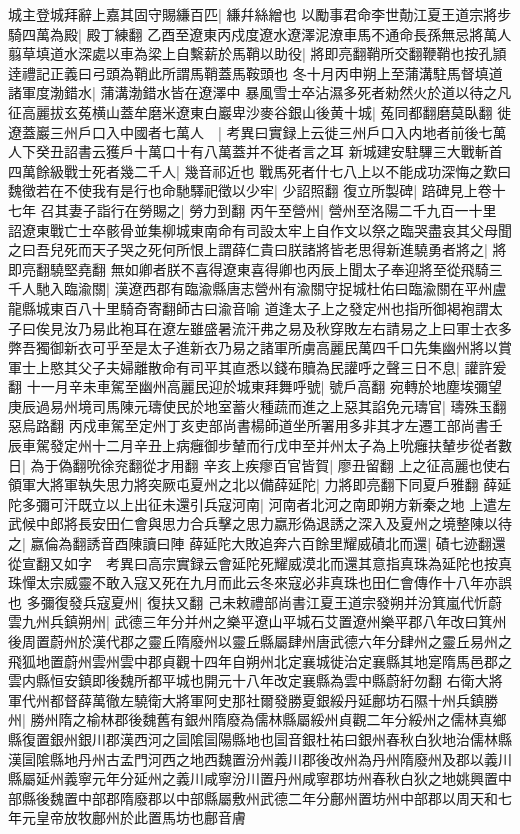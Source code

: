 城主登城拜辭上嘉其固守賜縑百匹|{
	縑幷絲繒也}
以勵事君命李世勣江夏王道宗將步騎四萬為殿|{
	殿丁練翻}
乙酉至遼東丙戍度遼水遼澤泥潦車馬不通命長孫無忌將萬人翦草填道水深處以車為梁上自繫薪於馬鞘以助役|{
	將即亮翻鞘所交翻鞭鞘也按孔頴逹禮記正義曰弓頭為鞘此所謂馬鞘蓋馬鞍頭也}
冬十月丙申朔上至蒲溝駐馬督填道諸軍度渤錯水|{
	蒲溝渤錯水皆在遼澤中}
暴風雪士卒沾濕多死者勑然火於道以待之凡征高麗拔玄菟横山蓋牟磨米遼東白巖卑沙麥谷銀山後黄十城|{
	菟同都翻磨莫臥翻}
徙遼蓋巖三州戶口入中國者七萬人　|{
	考異曰實録上云徙三州戶口入内地者前後七萬人下癸丑詔書云獲戶十萬口十有八萬蓋并不徙者言之耳}
新城建安駐驆三大戰斬首四萬餘級戰士死者幾二千人|{
	幾音祁近也}
戰馬死者什七八上以不能成功深悔之歎曰魏徵若在不使我有是行也命馳驛祀徵以少牢|{
	少詔照翻}
復立所製碑|{
	踣碑見上卷十七年}
召其妻子詣行在勞賜之|{
	勞力到翻}
丙午至營州|{
	營州至洛陽二千九百一十里}
詔遼東戰亡士卒骸骨並集柳城東南命有司設太牢上自作文以祭之臨哭盡哀其父母聞之曰吾兒死而天子哭之死何所恨上謂薛仁貴曰朕諸將皆老思得新進驍勇者將之|{
	將即亮翻驍堅堯翻}
無如卿者朕不喜得遼東喜得卿也丙辰上聞太子奉迎將至從飛騎三千人馳入臨渝關|{
	漢遼西郡有臨渝縣唐志營州有渝關守捉城杜佑曰臨渝關在平州盧龍縣城東百八十里騎奇寄翻師古曰渝音喻}
道逢太子上之發定州也指所御褐袍謂太子曰俟見汝乃易此袍耳在遼左雖盛暑流汗弗之易及秋穿敗左右請易之上曰軍士衣多弊吾獨御新衣可乎至是太子進新衣乃易之諸軍所虜高麗民萬四千口先集幽州將以賞軍士上愍其父子夫婦離散命有司平其直悉以錢布贖為民讙呼之聲三日不息|{
	讙許爰翻}
十一月辛未車駕至幽州高麗民迎於城東拜舞呼號|{
	號戶高翻}
宛轉於地塵埃彌望庚辰過易州境司馬陳元璹使民於地室蓄火種蔬而進之上惡其諂免元璹官|{
	璹殊玉翻惡烏路翻}
丙戍車駕至定州丁亥吏部尚書楊師道坐所署用多非其才左遷工部尚書壬辰車駕發定州十二月辛丑上病癰御步輦而行戊申至并州太子為上吮癰扶輦步從者數日|{
	為于偽翻吮徐兖翻從才用翻}
辛亥上疾瘳百官皆賀|{
	廖丑留翻}
上之征高麗也使右領軍大將軍執失思力將突厥屯夏州之北以備薛延陀|{
	力將即亮翻下同夏戶雅翻}
薛延陀多彌可汗既立以上出征未還引兵寇河南|{
	河南者北河之南即朔方新秦之地}
上遣左武候中郎將長安田仁會與思力合兵擊之思力嬴形偽退誘之深入及夏州之境整陳以待之|{
	嬴倫為翻誘音酉陳讀曰陣}
薛延陀大敗追奔六百餘里耀威磧北而還|{
	磧七迹翻還從宣翻又如字　考異曰高宗實録云會延陀死耀威漠北而還其意指真珠為延陀也按真珠憚太宗威靈不敢入寇又死在九月而此云冬來寇必非真珠也田仁會傳作十八年亦誤也}
多彌復發兵寇夏州|{
	復扶又翻}
己未敕禮部尚書江夏王道宗發朔并汾箕嵐代忻蔚雲九州兵鎮朔州|{
	武德三年分并州之樂平遼山平城石艾置遼州樂平郡八年改曰箕州後周置蔚州於漢代郡之靈丘隋廢州以靈丘縣屬肆州唐武德六年分肆州之靈丘易州之飛狐地置蔚州雲州雲中郡貞觀十四年自朔州北定襄城徙治定襄縣其地寔隋馬邑郡之雲内縣恒安鎮即後魏所都平城也開元十八年改定襄縣為雲中縣蔚紆勿翻}
右衛大將軍代州都督薛萬徹左驍衛大將軍阿史那社爾發勝夏銀綏丹延鄜坊石隰十州兵鎮勝州|{
	勝州隋之榆林郡後魏舊有銀州隋廢為儒林縣屬綏州貞觀二年分綏州之儒林真鄉縣復置銀州銀川郡漢西河之圁隂圁陽縣地也圁音銀杜祐曰銀州春秋白狄地治儒林縣漢圁隂縣地丹州古孟門河西之地西魏置汾州義川郡後改州為丹州隋廢州及郡以義川縣屬延州義寧元年分延州之義川咸寧汾川置丹州咸寧郡坊州春秋白狄之地姚興置中部縣後魏置中部郡隋廢郡以中部縣屬敷州武德二年分鄜州置坊州中部郡以周天和七年元皇帝放牧鄜州於此置馬坊也鄜音膚}
